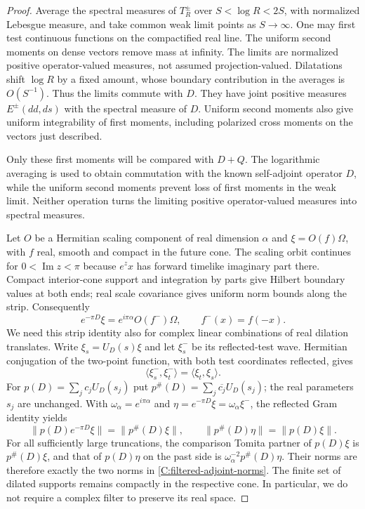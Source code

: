 \begin{proof}
Average the spectral measures of $T_R^\pm$ over
$S<\log R<2S$, with normalized Lebesgue measure, and take
common weak limit points as $S\to\infty$. One may first
test continuous functions on the compactified real line.
The uniform second moments on dense vectors remove mass
at infinity. The limits are normalized positive
operator-valued measures, not assumed projection-valued.
Dilatations shift $\log R$ by a fixed amount, whose
boundary contribution in the averages is $O(S^{-1})$.
Thus the limits commute with $D$. They have joint
positive measures $E^\pm(dd,ds)$ with the spectral
measure of $D$. Uniform second moments also give uniform
integrability of first moments, including polarized
cross moments on the vectors just described.

Only these first moments will be compared with $D+Q$.  The
logarithmic averaging is used to obtain commutation with the known
self-adjoint operator $D$, while the uniform second moments prevent
loss of first moments in the weak limit.  Neither operation turns
the limiting positive operator-valued measures into spectral measures.

Let $O$ be a Hermitian scaling component of real dimension
$\alpha$ and $\xi=O(f)\Omega$, with $f$ real, smooth and compact
in the future cone. The scaling orbit continues for
$0<\operatorname{Im}z<\pi$ because $e^zx$ has forward
timelike imaginary part there. Compact interior-cone
support and integration by parts give Hilbert boundary
values at both ends; real scale covariance gives uniform
norm bounds along the strip. Consequently
\begin{equation}\label{C:single-scale-strip}
 e^{-\pi D}\xi=e^{i\pi\alpha}O(f^-)\Omega,
 \qquad f^-(x)=f(-x).
\end{equation}
We need this strip identity also for complex linear combinations of
real dilation translates. Write $\xi_s=U_D(s)\xi$ and let
$\xi_s^-$ be its reflected-test wave. Hermitian conjugation of the
two-point function, with both test coordinates reflected, gives
\[
 \langle\xi_s^-,\xi_t^-\rangle=\langle\xi_t,\xi_s\rangle.
\]
For $p(D)=\sum_jc_jU_D(s_j)$ put
$p^\#(D)=\sum_j\overline{c_j}U_D(s_j)$; the real parameters $s_j$
are unchanged. With $\omega_\alpha=e^{i\pi\alpha}$ and
$\eta=e^{-\pi D}\xi=\omega_\alpha\xi^-$, the reflected Gram identity yields
\begin{equation}\label{C:filtered-adjoint-norms}
 \|p(D)e^{-\pi D}\xi\|=\|p^\#(D)\xi\|,
 \qquad \|p^\#(D)\eta\|=\|p(D)\xi\|.
\end{equation}
For all sufficiently large truncations, the comparison Tomita partner
of $p(D)\xi$ is $p^\#(D)\xi$, and that of $p(D)\eta$ on the past
side is $\omega_\alpha^{-2}p^\#(D)\eta$. Their norms are therefore exactly
the two norms in \eqref{C:filtered-adjoint-norms}. The finite set of
dilated supports remains compactly in the respective cone. In
particular, we do not require a complex filter to preserve its real space.


\end{proof}
